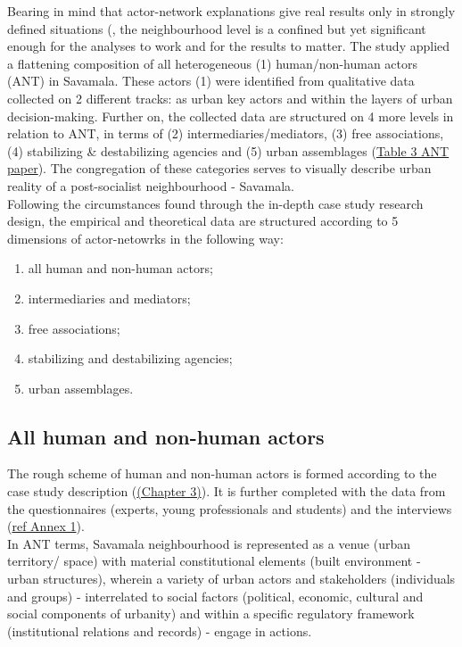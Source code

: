 \documentclass[11pt]{report}
\begin{document}
Bearing in mind that actor-network explanations give real results only in strongly defined situations (\cite{Farías and Bender, 2011)}, the neighbourhood level is a confined but yet significant enough for the analyses to work and for the results to matter.
The study applied a flattening composition of all heterogeneous (1) human/non-human actors (ANT) in Savamala.
These actors (1) were identified from qualitative data collected on 2 different tracks: as urban key actors and within the layers of urban decision-making.
Further on, the collected data are structured on 4 more levels in relation to ANT, in terms of (2) intermediaries/mediators, (3) free associations, (4) stabilizing \& destabilizing agencies and (5) urban assemblages (\href{}{Table 3 ANT paper}).
The congregation of these categories serves to visually describe urban reality of a post-socialist neighbourhood - Savamala.
\\

Following the circumstances found through the in-depth case study research design, the empirical and theoretical data are structured according to 5 dimensions of actor-netowrks in the following way:

\begin{enumerate}
\item all human and non-human actors;
\item intermediaries and mediators;
\item free associations;
\item stabilizing and destabilizing agencies;
\item urban assemblages.
\end{enumerate}

\subsection{All human and non-human actors}

The rough scheme of human and non-human actors is formed according to the case study description
(\href{}{(Chapter 3)}). It is further completed with the data from the questionnaires (experts, young professionals and students) and the interviews
(\href{}{ref Annex 1}).
\\

In ANT terms, Savamala neighbourhood is represented as a venue (urban territory/ space) with material constitutional elements (built environment - urban structures), wherein a variety of urban actors and stakeholders (individuals and groups) - interrelated to social factors (political, economic, cultural and social components of urbanity) and within a specific regulatory framework (institutional relations and records) - engage in actions.
\\
\end{document}
